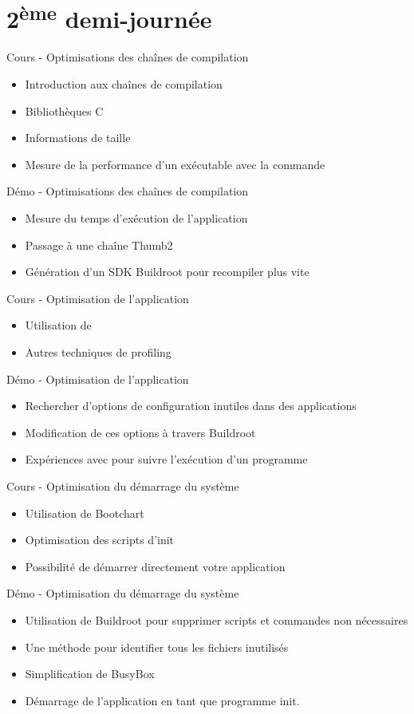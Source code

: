 \documentclass[a4paper,12pt,obeyspaces,spaces,hyphens]{article}
\begin{document}
\section{2\textsuperscript{ème} demi-journée}

\feagendaonecolumn
{Cours - Optimisations des chaînes de compilation}
{
  \begin{itemize}
  \item Introduction aux chaînes de compilation
  \item Bibliothèques C
  \item Informations de taille
  \item Mesure de la performance d'un exécutable avec la commande 
  \end{itemize}
}

\feagendaonecolumn
{Démo - Optimisations des chaînes de compilation}
{
  \begin{itemize}
  \item Mesure du temps d'exécution de l'application
  \item Passage à une chaîne Thumb2
  \item Génération d'un SDK Buildroot pour recompiler plus vite
  \end{itemize}
}

\feagendatwocolumn
{Cours - Optimisation de l'application}
{
  \begin{itemize}
  \item Utilisation de 
  \item Autres techniques de profiling
  \end{itemize}
}
{Démo - Optimisation de l'application}
{
 \begin{itemize}
 \item Rechercher d'options de configuration inutiles dans des applications
 \item Modification de ces options à travers Buildroot
 \item Expériences avec  pour suivre l'exécution d'un programme
 \end{itemize}
}

\feagendatwocolumn
{Cours - Optimisation du démarrage du système}
{
  \begin{itemize}
  \item Utilisation de Bootchart
  \item Optimisation des scripts d'init
  \item Possibilité de démarrer directement votre application
  \end{itemize}
}
{Démo - Optimisation du démarrage du système}
{
 \begin{itemize}
 \item Utilisation de Buildroot pour supprimer scripts et commandes non nécessaires
 \item Une méthode pour identifier tous les fichiers inutilisés
 \item Simplification de BusyBox
 \item Démarrage de l'application en tant que programme init.
 \end{itemize}
}
\end{document}
